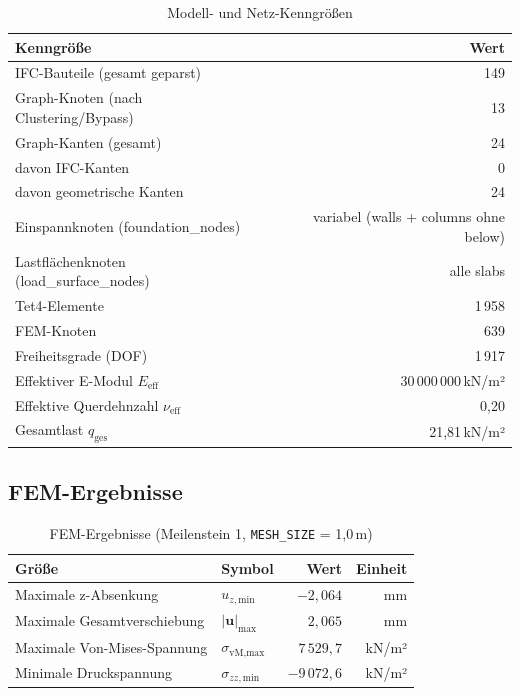\documentclass[a4paper,11pt]{article}
\begin{document}
\begin{table}[H]
\centering
\caption{Modell- und Netz-Kenngrößen}
\begin{tabular}{lr}
\toprule
\textbf{Kenngröße} & \textbf{Wert} \\
\midrule
IFC-Bauteile (gesamt geparst) & 149 \\
Graph-Knoten (nach Clustering/Bypass) & 13 \\
Graph-Kanten (gesamt) & 24 \\
\quad davon IFC-Kanten & 0 \\
\quad davon geometrische Kanten & 24 \\
Einspannknoten (foundation\_nodes) & variabel (walls + columns ohne below) \\
Lastflächenknoten (load\_surface\_nodes) & alle slabs \\
Tet4-Elemente & 1\,958 \\
FEM-Knoten & 639 \\
Freiheitsgrade (DOF) & 1\,917 \\
Effektiver E-Modul $E_\text{eff}$ & 30\,000\,000\,kN/m² \\
Effektive Querdehnzahl $\nu_\text{eff}$ & 0{,}20 \\
Gesamtlast $q_\text{ges}$ & 21{,}81\,kN/m² \\
\bottomrule
\end{tabular}
\end{table}

\subsection{FEM-Ergebnisse}

\begin{table}[H]
\centering
\caption{FEM-Ergebnisse (Meilenstein 1, \texttt{MESH\_SIZE} = 1{,}0\,m)}
\begin{tabular}{llrr}
\toprule
\textbf{Größe} & \textbf{Symbol} & \textbf{Wert} & \textbf{Einheit} \\
\midrule
Maximale z-Absenkung & $u_{z,\text{min}}$ & $-2{,}064$ & mm \\
Maximale Gesamtverschiebung & $|\mathbf{u}|_\text{max}$ & $2{,}065$ & mm \\
Maximale Von-Mises-Spannung & $\sigma_{\text{vM,max}}$ & $7\,529{,}7$ & kN/m² \\
Minimale Druckspannung & $\sigma_{zz,\text{min}}$ & $-9\,072{,}6$ & kN/m² \\
\bottomrule
\end{tabular}
\end{table}
\end{document}
